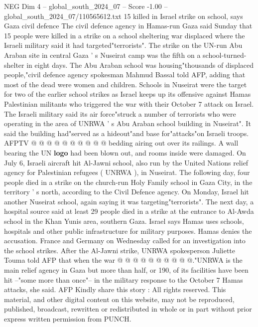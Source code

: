\begin{textsample}{NEG Dim 4 – global\_south\_2024\_07 – Score -1.00 – global\_south\_2024\_07/110565612.txt}  \label{ex:f4_neg_342}
15 killed in Israel strike on school, says Gaza civil defence The civil defence agency in Hamas-run Gaza said Sunday that 15 people were killed in a strike on a school sheltering war displaced where the Israeli military said it had targeted"terrorists".
The strike on the UN-run Abu Araban site in central Gaza ' s Nuseirat camp was the fifth on a school-turned-shelter in eight days.
The Abu Araban school was housing"thousands of displaced people,"civil defence agency spokesman Mahmud Bassal told AFP, adding that most of the dead were women and children.
Schools in Nuseirat were the target for two of the earlier school strikes as Israel keeps up its offensive against Hamas Palestinian militants who triggered the war with their October 7 attack on Israel.
The Israeli military said its air force"struck a number of terrorists who were operating in the area of UNRWA ' s Abu Araban school building in Nuseirat".
It said the building had"served as a hideout"and base for"attacks"on Israeli troops.
AFPTV @ @ @ @ @ @ @ @ @ @ bedding airing out over its railings.
A wall bearing the UN \textbf{logo} had been blown out, and rooms inside were damaged.
On July 6, Israeli aircraft hit Al-Jawni school, also run by the United Nations relief agency for Palestinian refugees ( UNRWA ), in Nuseirat.
The following day, four people died in a strike on the church-run Holy Family school in Gaza City, in the territory ' s north, according to the Civil Defence agency.
On Monday, Israel hit another Nuseirat school, again saying it was targeting"terrorists".
The next day, a hospital source said at least 29 people died in a strike at the entrance to Al-Awda school in the Khan Yunis area, southern Gaza.
Israel says Hamas uses schools, hospitals and other public infrastructure for military purposes.
Hamas denies the accusation.
France and Germany on Wednesday called for an investigation into the school strikes.
After the Al-Jawni strike, UNRWA spokesperson Juliette Touma told AFP that when the war @ @ @ @ @ @ @ @ @ @."UNRWA is the main relief agency in Gaza but more than half, or 190, of its facilities have been hit --"some more than once"-- in the military response to the October 7 Hamas attacks, she said.
AFP Kindly share this story : All rights reserved.
This material, and other digital content on this website, may not be reproduced, published, broadcast, rewritten or redistributed in whole or in part without prior express written permission from PUNCH.

\end{textsample}

